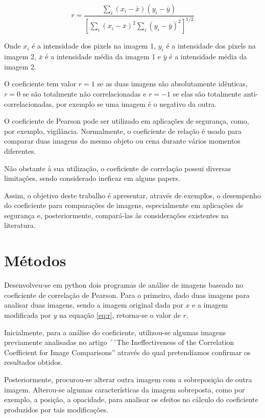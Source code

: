 \documentclass[10pt,a4paper]{article}
\begin{document}
\begin{equation}r = \frac{  
    \displaystyle{\sum_{i} (x_i-\bar{x})(y_i-  
      \bar{y})}}{\displaystyle{\left[  
        \sum_{i}(x_i-\bar{x})^2  
        \sum_{i}(y_i-\bar{y})^2\right]^{1/2}}}  \label{eq:r}
\end{equation}  

Onde $x_i$ é a intensidade dos pixels na imagem 1, $y_i$ é a
intensidade dos pixels na imagem 2, $\bar{x}$ é a intensidade média da
imagem 1 e $\bar{y}$ é a intensidade média da imagem 2.

O coeficiente tem valor $r=1$ se as duas imagens são absolutamente
idênticas, $r=0$ se são totalmente não correlacionadas e $r=-1$ se elas
são totalmente anti-correlacionadas, por exemplo se uma imagem é o
negativo da outra.

O coeficiente de Pearson pode ser utilizado em
aplicações de segurança, como, por exemplo, vigilância. Normalmente, 
o coeficiente de relação é usado para comparar duas imagens do mesmo
objeto ou cena durante vários momentos diferentes.

Não obstante à sua utilização, o coeficiente de correlação possui
diversas limitações, sendo considerado ineficaz em alguns papers.%

Assim, o objetivo deste trabalho é apresentar, através de exemplos, o
desempenho do coeficiente para comparações de imagens, especialmente
em aplicações de segurança e, posteriormente, compará-las às considerações existentes na literatura.


\section{Métodos}

Desenvolveu-se em python dois programas de análise de imagens baseado no
coeficiente de correlação de Pearson. Para o primeiro, dado duas imagens para analisar duas imagens, sendo a imagem original dada por $x$  e a
imagem modificada por $y$ na equação \eqref{eq:r}, retorna-se o valor de $r$.

Inicialmente, para a análise do coeficiente, utilizou-se algumas imagens
previamente analisadas no artigo ´´The Ineffectiveness of the Correlation
Coefficient for Image Comparisons'' através do qual pretendíamos
confirmar os resultados obtidos.

Posteriormente, procurou-se alterar outra imagem com a
sobreposição de outra imagem. Alterou-se algumas características da
imagem sobreposta, como por exemplo, a posição, a opacidade, para
analisar os efeitos no cálculo do coeficiente produzidos por tais modificações. 
\end{document}
